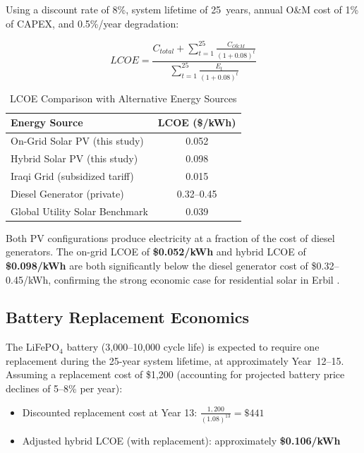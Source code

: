 Using a discount rate of 8\%, system lifetime of 25~years, annual O\&M cost of 1\% of CAPEX, and 0.5\%/year degradation:

\begin{equation}
    LCOE = \frac{C_{total} + \sum_{t=1}^{25} \frac{C_{O\&M}}{(1+0.08)^t}}{\sum_{t=1}^{25} \frac{E_t}{(1+0.08)^t}}
\end{equation}

\begin{table}[H]
\centering
\caption{LCOE Comparison with Alternative Energy Sources}
\label{tab:lcoe_comparison}
\begin{tabular}{@{}p{6cm} c@{}}
\toprule
\textbf{Energy Source} & \textbf{LCOE (\$/kWh)} \\
\midrule
On-Grid Solar PV (this study) & 0.052 \\
Hybrid Solar PV (this study) & 0.098 \\
Iraqi Grid (subsidized tariff) & 0.015 \\
Diesel Generator (private) & 0.32--0.45 \\
Global Utility Solar Benchmark & 0.039 \\
\bottomrule
\end{tabular}
\end{table}

Both PV configurations produce electricity at a fraction of the cost of diesel generators. The on-grid LCOE of \textbf{\$0.052/kWh} and hybrid LCOE of \textbf{\$0.098/kWh} are both significantly below the diesel generator cost of \$0.32--0.45/kWh, confirming the strong economic case for residential solar in Erbil \cite{bnef2025}.


\subsection{Battery Replacement Economics}

The LiFePO$_4$ battery (3,000--10,000 cycle life) is expected to require one replacement during the 25-year system lifetime, at approximately Year~12--15. Assuming a replacement cost of \$1,200 (accounting for projected battery price declines of 5--8\% per year):

\begin{itemize}
    \item Discounted replacement cost at Year 13: $\frac{1{,}200}{(1.08)^{13}} = \$441$
    \item Adjusted hybrid LCOE (with replacement): approximately \textbf{\$0.106/kWh}
\end{itemize}

